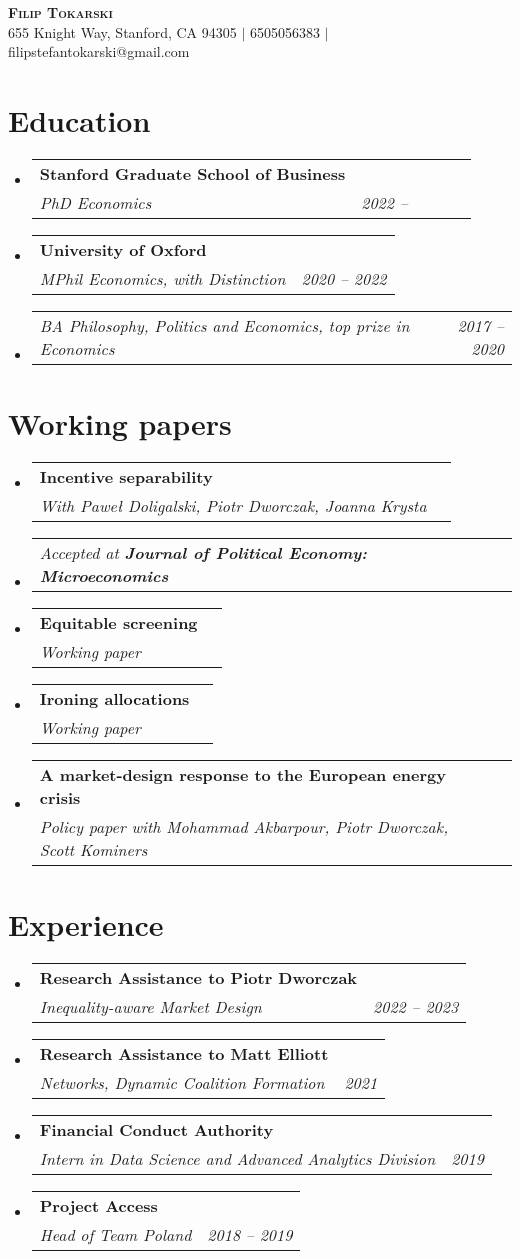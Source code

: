 \documentclass[letterpaper,11pt]{article}
\makeatletter
\newcommand{\resumeSubheading}[3]{
  \vspace{-2pt}\item
    \begin{tabular*}{0.97\textwidth}[t]{l@{\extracolsep{\fill}}r}
      \textbf{#1} \\
      \textit{\small#2} & \textit{\small #3} \\
    \end{tabular*}\vspace{-7pt}
}
\newcommand{\resumeSubSubheading}[2]{
    \item
    \begin{tabular*}{0.97\textwidth}{l@{\extracolsep{\fill}}r}
      \textit{\small#1} & \textit{\small #2} \\
    \end{tabular*}\vspace{-7pt}
}
\newcommand{\resumeSubHeadingListStart}{\begin{itemize}[leftmargin=0.15in, label={}]}
\newcommand{\resumeSubHeadingListEnd}{\end{itemize}}
\makeatother
\begin{document}
\begin{center}
    \textbf{\Huge \scshape Filip Tokarski} \\ \vspace{1pt}
    \small 655 Knight Way, Stanford, CA 94305 $|$
    \small 6505056383 $|$
    \small filipstefantokarski@gmail.com %
\end{center}



\section{Education}
  \resumeSubHeadingListStart
    \resumeSubheading
      {Stanford Graduate School of Business}
      {PhD Economics}{2022 -- \ \ \ \ \ \ }
    \resumeSubHeadingListEnd
  \resumeSubHeadingListStart
    \resumeSubheading
      {University of Oxford}
      {MPhil Economics, with Distinction}{2020 -- 2022}
        \resumeSubSubheading
      {BA Philosophy, Politics and Economics, top prize in Economics}{2017 -- 2020}
  \resumeSubHeadingListEnd

\bigskip



\section{Working papers}
  \resumeSubHeadingListStart
  \resumeSubheading
      {Incentive separability}
      {With Pawe\l{} Doligalski, Piotr Dworczak, Joanna Krysta}{}
      \resumeSubSubheading
      {Accepted at \textbf{Journal of Political Economy: Microeconomics}}{}
  \resumeSubheading
  {Equitable screening}
  {Working paper}{}
    \resumeSubheading
    {Ironing allocations}
    {Working paper}{}
    \resumeSubheading
      {A market-design response to the European energy crisis}
      {Policy paper with Mohammad Akbarpour, Piotr Dworczak, Scott Kominers}{}
  \resumeSubHeadingListEnd

\bigskip




\section{Experience}
  \resumeSubHeadingListStart
      \resumeSubheading
      {Research Assistance to Piotr Dworczak}
      {Inequality-aware Market Design}{2022 -- 2023}
     \resumeSubheading
      {Research Assistance to Matt Elliott}
      {Networks, Dynamic Coalition Formation}{2021}
    \resumeSubheading
      {Financial Conduct Authority}
      {Intern in Data Science and Advanced Analytics Division}{2019}
    \resumeSubheading
      {Project Access}
      {Head of Team Poland}{2018 -- 2019}
  \resumeSubHeadingListEnd
\end{document}
